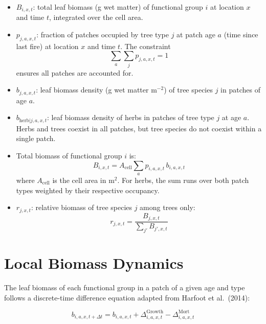 \documentclass[12pt]{article}
\begin{document}
\begin{itemize}
    \item $B_{i,x,t}$: total leaf biomass (g wet matter) of functional group $i$ at
          location $x$ and time $t$, integrated over the cell area.
    \item $p_{j,a,x,t}$: fraction of patches occupied by tree type $j$ at patch age
          $a$ (time since last fire) at location $x$ and time $t$. The constraint
          \begin{equation}
              \sum_{a}\sum_{j} p_{j,a,x,t} = 1
          \end{equation}
          ensures all patches are accounted for.
    \item $b_{j,a,x,t}$: leaf biomass density (g wet matter m$^{-2}$) of tree species
          $j$ in patches of age $a$.
    \item $b_{\mathrm{herb}|j,a,x,t}$: leaf biomass density of herbs in patches of
          tree type $j$ at age $a$. Herbs and trees coexist in all patches, but tree
          species do not coexist within a single patch.
    \item Total biomass of functional group $i$ is:
          \begin{equation}
              B_{i,x,t} = A_{\mathrm{cell}} \sum_{a} p_{i,a,x,t}\, b_{i,a,x,t}
          \end{equation}
          where $A_{\mathrm{cell}}$ is the cell area in m$^2$. For herbs, the sum
          runs over both patch types weighted by their respective occupancy.
    \item $r_{j,x,t}$: relative biomass of tree species $j$ among trees only:
          \begin{equation}
              r_{j,x,t} = \frac{B_{j,x,t}}{\displaystyle\sum_{j'} B_{j',x,t}}
          \end{equation}
\end{itemize}

\section{Local Biomass Dynamics}

The leaf biomass of each functional group in a patch of a given age and type follows
a discrete-time difference equation adapted from Harfoot et al.\ (2014):

\begin{equation}
    b_{i,a,x,t+\Delta t} = b_{i,a,x,t} + \Delta^{\mathrm{Growth}}_{i,a,x,t}
                           - \Delta^{\mathrm{Mort}}_{i,a,x,t}
    \label{eq:biomass}
\end{equation}
\end{document}
